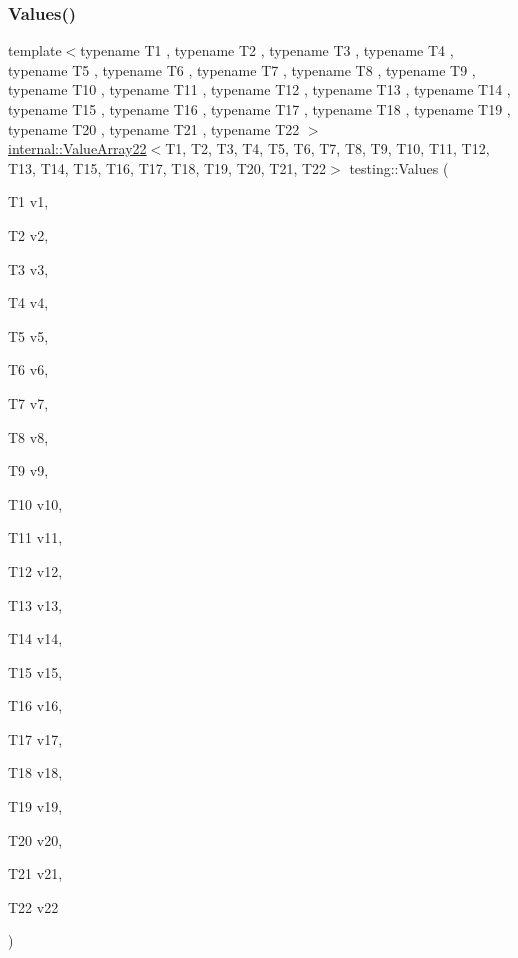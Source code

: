 \subsubsection{\texorpdfstring{Values()}{Values()}\hspace{0.1cm}{\footnotesize\ttfamily [22/50]}}
{\footnotesize\ttfamily template$<$typename T1 , typename T2 , typename T3 , typename T4 , typename T5 , typename T6 , typename T7 , typename T8 , typename T9 , typename T10 , typename T11 , typename T12 , typename T13 , typename T14 , typename T15 , typename T16 , typename T17 , typename T18 , typename T19 , typename T20 , typename T21 , typename T22 $>$ \\
\mbox{\hyperlink{classtesting_1_1internal_1_1ValueArray22}{internal\+::\+Value\+Array22}}$<$T1, T2, T3, T4, T5, T6, T7, T8, T9, T10, T11, T12, T13, T14, T15, T16, T17, T18, T19, T20, T21, T22$>$ testing\+::\+Values (\begin{DoxyParamCaption}\item[{T1}]{v1,  }\item[{T2}]{v2,  }\item[{T3}]{v3,  }\item[{T4}]{v4,  }\item[{T5}]{v5,  }\item[{T6}]{v6,  }\item[{T7}]{v7,  }\item[{T8}]{v8,  }\item[{T9}]{v9,  }\item[{T10}]{v10,  }\item[{T11}]{v11,  }\item[{T12}]{v12,  }\item[{T13}]{v13,  }\item[{T14}]{v14,  }\item[{T15}]{v15,  }\item[{T16}]{v16,  }\item[{T17}]{v17,  }\item[{T18}]{v18,  }\item[{T19}]{v19,  }\item[{T20}]{v20,  }\item[{T21}]{v21,  }\item[{T22}]{v22 }\end{DoxyParamCaption})}

\mbox{\label{namespacetesting_a820991f1c28518a0c218176bd7192de8}} 
